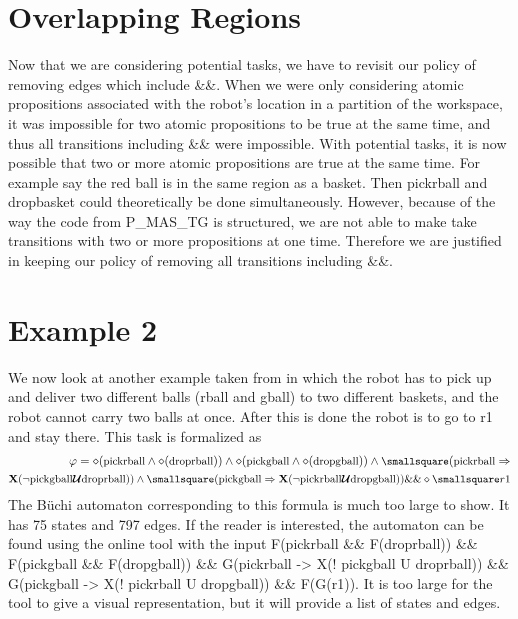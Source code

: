 \section{Overlapping Regions}
Now that we are considering potential tasks, we have to revisit our policy of removing edges which include \&\&. When we were only considering atomic propositions associated with the robot's location in a partition of the workspace, it was impossible for two atomic propositions to be true at the same time, and thus all transitions including \&\& were impossible. With potential tasks, it is now possible that two or more atomic propositions are true at the same time. For example say the red ball is in the same region as a basket. Then pickrball and dropbasket could theoretically be done simultaneously. However, because of the way the code from P\_MAS\_TG \cite{pMasGit} is structured, we are not able to make take transitions with two or more propositions at one time. Therefore we are justified in keeping our policy of removing all transitions including \&\&. 





\section{Example 2}
We now look at another example taken from \cite{guo15} in which the robot has to pick up and deliver two different balls (rball and gball) to two different baskets, and the robot cannot carry two balls at once. After this is done the robot is to go to r1 and stay there. This task is formalized as 
\begin{align*}
\small \varphi = \diamond (\text{pickrball} \wedge \diamond (\text{droprball})) \wedge \diamond(\text{pickgball} \wedge \diamond (\text{dropgball})) \wedge \smallsquare (\text{pickrball} \Rightarrow \\
 \small \textbf{X}(\neg \text{pickgball} \U \text{droprball})) \wedge \smallsquare (\text{pickgball} \Rightarrow \textbf{X} (\neg \text{pickrball} \U \text{dropgball})) \&\& \diamond \smallsquare r1
\end{align*}
The B\"uchi automaton corresponding to this formula is much too large to show. It has 75 states and 797 edges. If the reader is interested, the automaton can be found using the online tool \cite{ltlbuchiwebsite} with the input F(pickrball \&\& F(droprball)) \&\& F(pickgball \&\& F(dropgball)) \&\& G(pickrball -> X(! pickgball U droprball)) \&\& G(pickgball -> X(! pickrball U dropgball)) \&\& F(G(r1)). It is too large for the tool to give a visual representation, but it will provide a list of states and edges.  

